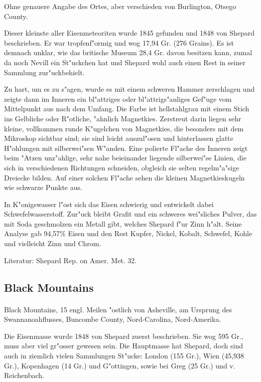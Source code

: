 \documentclass[a4paper, 11pt, oneside]{article}
\begin{document}
Ohne genauere Angabe des Ortes, aber verschieden von Burlington, Otsego County.

Dieser kleinste aller Eisenmeteoriten wurde 1845 gefunden und 1848 von Shepard beschrieben. Er war tropfenf"ormig und wog 17,94 Gr. (276 Grains). Es ist demnach unklar, wie das britische Museum 28,4 Gr. davon besitzen kann, zumal da noch Nevill ein St"uckchen hat und Shepard wohl auch einen Rest in seiner Sammlung zur"uckbehielt.

Zu hart, um es zu s"agen, wurde es mit einem schweren Hammer zerschlagen und zeigte dann im Inneren ein bl"attriges oder bl"attrigs"auliges Gef"uge vom Mittelpunkt aus nach dem Umfang. Die Farbe ist hellstahlgrau mit einem Stich ins Gelbliche oder R"otliche, "ahnlich Magnetkies. Zerstreut darin liegen sehr kleine, vollkommen runde K"ugelchen von Magnetkies, die besonders mit dem Mikroskop sichtbar sind; sie sind leicht auszul"osen und hinterlassen glatte H"ohlungen mit silberwei"sen W"anden. Eine polierte Fl"ache des Inneren zeigt beim "Atzen unz"ahlige, sehr nahe beieinander liegende silberwei"se Linien, die sich in verschiedenen Richtungen schneiden, obgleich sie selten regelm"a"sige Dreiecke bilden. Auf einer solchen Fl"ache sehen die kleinen Magnetkieskugeln wie schwarze Punkte aus.

In K"onigswasser l"ost sich das Eisen schwierig und entwickelt dabei Schwefelwasserstoff. Zur"uck bleibt Grafit und ein schweres wei"sliches Pulver, das mit Soda geschmolzen ein Metall gibt, welches Shepard f"ur Zinn h"alt. Seine Analyse gab 94,57\% Eisen und den Rest Kupfer, Nickel, Kobalt, Schwefel, Kohle und vielleicht Zinn und Chrom.

\footnotesize
Literatur: Shepard Rep. on Amer. Met. 32.

\subsection{Black Mountains}
\normalsize
\paragraph{}
Black Mountains, 15 engl. Meilen "ostlich von Asheville, am Ursprung des Swannanoahflusses, Buncombe County, Nord-Carolina, Nord-Amerika.

Die Eisenmasse wurde 1848 von Shepard zuerst beschrieben. Sie wog 595 Gr., muss aber viel gr"osser gewesen sein. Die Hauptmasse hat Shepard, doch sind auch in ziemlich vielen Sammlungen St"ucke: London (155 Gr.), Wien (45,938 Gr.), Kopenhagen (14 Gr.) und G"ottingen, sowie bei Greg (25 Gr.) und v. Reichenbach.
\end{document}
